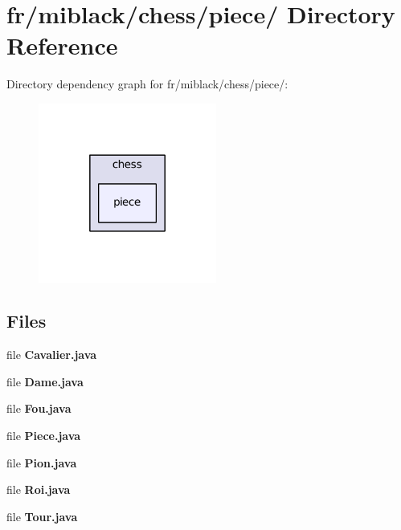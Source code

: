 \section{fr/miblack/chess/piece/ Directory Reference}
\label{dir_00968005b59e10d4c4e97f82ec8ee4ce}
Directory dependency graph for fr/miblack/chess/piece/\-:
\nopagebreak
\begin{figure}[H]
\begin{center}
\leavevmode
\includegraphics[width=166pt]{dir_00968005b59e10d4c4e97f82ec8ee4ce_dep}
\end{center}
\end{figure}
\subsection*{Files}
\begin{DoxyCompactItemize}
\item 
file {\bf Cavalier.\-java}
\item 
file {\bf Dame.\-java}
\item 
file {\bf Fou.\-java}
\item 
file {\bf Piece.\-java}
\item 
file {\bf Pion.\-java}
\item 
file {\bf Roi.\-java}
\item 
file {\bf Tour.\-java}
\end{DoxyCompactItemize}
